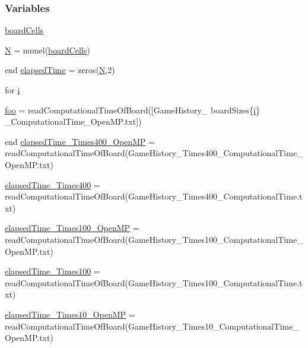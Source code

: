 \subsubsection*{Variables}
\begin{DoxyCompactItemize}
\item 
\hyperlink{a00100_a9a8e1837f52184441d209914b37780be}{board\+Cells}
\item 
\hyperlink{a00100_a8cc2e7240164328fdc3f0e5e21032c56}{N} = numel(\hyperlink{a00100_a9a8e1837f52184441d209914b37780be}{board\+Cells})
\item 
end \hyperlink{a00100_ab95225146f45d9e8e1089618cf68c6e1}{elapsed\+Time} = zeros(\hyperlink{a00100_a8cc2e7240164328fdc3f0e5e21032c56}{N},2)
\item 
for \hyperlink{a00100_a6f6ccfcf58b31cb6412107d9d5281426}{i}
\item 
\hyperlink{a00100_afdba98970961edb29f88241b9d99d890}{foo} = read\+Computational\+Time\+Of\+Board(\mbox{[}\textquotesingle{}Game\+History\+\_\+\textquotesingle{} board\+Sizes\{\hyperlink{a00107_a6f6ccfcf58b31cb6412107d9d5281426}{i}\} \textquotesingle{}\+\_\+\+Computational\+Time\+\_\+\+Open\+M\+P.\+txt\textquotesingle{}\mbox{]})
\item 
end \hyperlink{a00100_adb44ff1fb324f5ca58520511cca92ed7}{elapsed\+Time\+\_\+Times400\+\_\+\+Open\+M\+P} = read\+Computational\+Time\+Of\+Board(\textquotesingle{}Game\+History\+\_\+Times400\+\_\+\+Computational\+Time\+\_\+\+Open\+M\+P.\+txt\textquotesingle{})
\item 
\hyperlink{a00100_a03937bae300a959855cddd0d6d315fc0}{elapsed\+Time\+\_\+Times400} = read\+Computational\+Time\+Of\+Board(\textquotesingle{}Game\+History\+\_\+Times400\+\_\+\+Computational\+Time.\+txt\textquotesingle{})
\item 
\hyperlink{a00100_a81a8ed9e2700c8561764b5a0bf578447}{elapsed\+Time\+\_\+Times100\+\_\+\+Open\+M\+P} = read\+Computational\+Time\+Of\+Board(\textquotesingle{}Game\+History\+\_\+Times100\+\_\+\+Computational\+Time\+\_\+\+Open\+M\+P.\+txt\textquotesingle{})
\item 
\hyperlink{a00100_ab5f5a5607349d43d137f2d3d9b6ac81f}{elapsed\+Time\+\_\+Times100} = read\+Computational\+Time\+Of\+Board(\textquotesingle{}Game\+History\+\_\+Times100\+\_\+\+Computational\+Time.\+txt\textquotesingle{})
\item 
\hyperlink{a00100_abb7203de0010df4491d1db729b4985ac}{elapsed\+Time\+\_\+Times10\+\_\+\+Open\+M\+P} = read\+Computational\+Time\+Of\+Board(\textquotesingle{}Game\+History\+\_\+Times10\+\_\+\+Computational\+Time\+\_\+\+Open\+M\+P.\+txt\textquotesingle{})

\end{DoxyCompactItemize}

